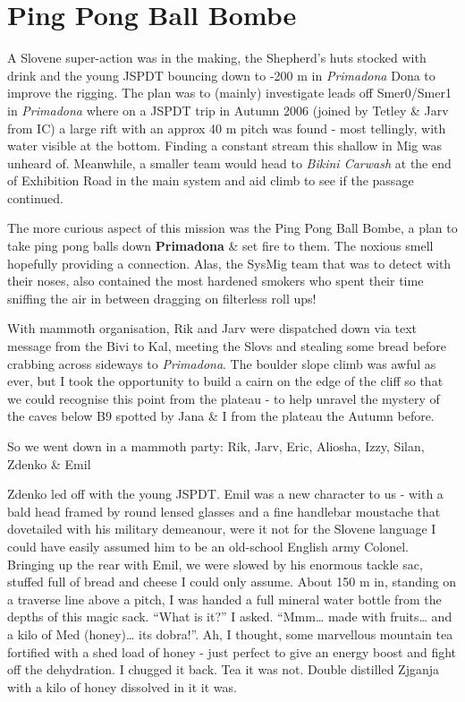 \section{Ping Pong Ball Bombe}

A Slovene super-action was in the making, the Shepherd's huts stocked
with drink and the young JSPDT bouncing down to -200 m in
\emph{Primadona} Dona to improve the rigging. The plan was to (mainly)
investigate leads off Smer0/Smer1 in \emph{Primadona} where on a JSPDT
trip in Autumn 2006 (joined by Tetley \& Jarv from IC) a large rift with
an approx 40 m pitch was found - most tellingly, with water visible at
the bottom. Finding a constant stream this shallow in Mig was unheard
of. Meanwhile, a smaller team would head to \emph{Bikini Carwash} at the
end of Exhibition Road in the main system and aid climb to see if the
passage continued.

The more curious aspect of this mission was the Ping Pong Ball Bombe, a
plan to take ping pong balls down \textbf{Primadona} \& set fire to
them. The noxious smell hopefully providing a connection. Alas, the
SysMig team that was to detect with their noses, also contained the most
hardened smokers who spent their time sniffing the air in between
dragging on filterless roll ups!

With mammoth organisation, Rik and Jarv were dispatched down via text
message from the Bivi to Kal, meeting the Slovs and stealing some bread
before crabbing across sideways to \emph{Primadona}. The boulder slope
climb was awful as ever, but I took the opportunity to build a cairn on
the edge of the cliff so that we could recognise this point from the
plateau - to help unravel the mystery of the caves below B9 spotted by
Jana \& I from the plateau the Autumn before.

So we went down in a mammoth party: Rik, Jarv, Eric, Aliosha, Izzy,
Silan, Zdenko \& Emil

Zdenko led off with the young JSPDT. Emil was a new character to us -
with a bald head framed by round lensed glasses and a fine handlebar
moustache that dovetailed with his military demeanour, were it not for
the Slovene language I could have easily assumed him to be an old-school
English army Colonel. Bringing up the rear with Emil, we were slowed by
his enormous tackle sac, stuffed full of bread and cheese I could only
assume. About 150 m in, standing on a traverse line above a pitch, I was
handed a full mineral water bottle from the depths of this magic sack.
``What is it?'' I asked. ``Mmm\ldots{} made with fruits\ldots{} and a
kilo of Med (honey)\ldots{} its dobra!''. Ah, I thought, some marvellous
mountain tea fortified with a shed load of honey - just perfect to give
an energy boost and fight off the dehydration. I chugged it back. Tea it
was not. Double distilled Zjganja with a kilo of honey dissolved in it
it was.

